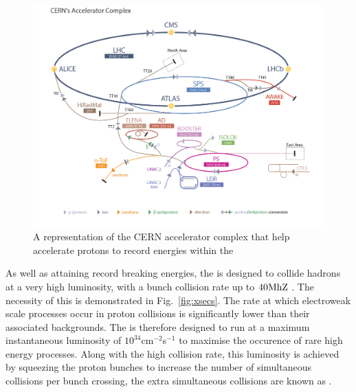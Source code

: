 \begin{figure}
  \includegraphics[width=\largefigwidth]{figs/LHC_default}
  \caption[]%
  {A representation of the CERN accelerator complex that help
  accelerate protons to record energies within the \LHC
  \cite{stfc:lhc}}%
  \label{fig:lhc}
\end{figure}

As well as attaining record breaking energies, the \LHC is designed to
collide hadrons at a very high luminosity, with a bunch collision rate
up to $40\text{MhZ}$ \cite{Evans:2008zzb}. The necessity of this is demonstrated in
Fig.~\ref{fig:xsecs}. The rate at which electroweak scale processes
occur in proton collisions is significantly lower than their
associated backgrounds. The \LHC is therefore designed to run at a
maximum instantaneous luminosity of $10^{34}$cm$^{-2}$s$^{-1}$ to
maximise the occurence of rare high energy processes. Along with
the high collision rate, this luminosity is achieved by squeezing the
proton bunches to increase the number of simultaneous collisions per
bunch crossing, the extra simultaneous collisions are known as \PU.


